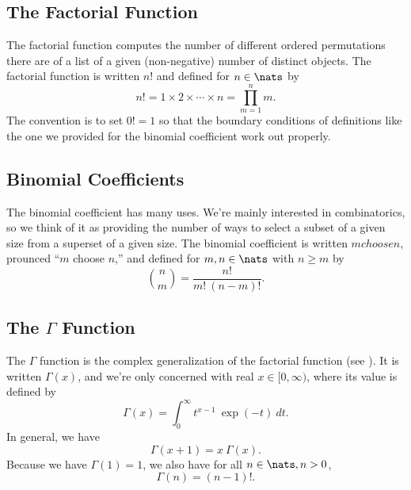 \subsection{The Factorial Function}\label{section:stats-factorial}

The factorial function computes the number of different ordered
permutations there are of a list of a given (non-negative) number of
distinct objects.  The factorial function is written $n!$
and defined for $n \in \nats$ by
%
\begin{equation}
n! = 1 \times 2 \times \cdots \times n = \prod_{m=1}^n m.
\end{equation}
%
The convention is to set $0! = 1$ so that the boundary conditions of
definitions like the one we provided for the binomial coefficient work
out properly.


\subsection{Binomial Coefficients}\label{section:stats-binomial-coefficient}

The binomial coefficient has many uses.  We're mainly interested in
combinatorics, so we think of it as providing the number of ways to
select a subset of a given size from a superset of a given size.  The
binomial coefficient is written ${m choose n}$, prounced ``$m$
choose $n$,'' and defined for $m, n \in \nats$ with $n \geq m$ by
%
\begin{equation}
{n \choose m} = \frac{n!}{m! \ (n-m)!}.
\end{equation}


\subsection{The $\Gamma$ Function}\label{section:stats-gamma-function}

The $\Gamma$ function is the complex generalization of the factorial
function (see ).  It is written $\Gamma(x)$, 
and we're only concerned with real $x \in [0,\infty)$, where its value
is defined by 
%
\begin{equation}
\Gamma(x) = \int_0^{\infty} t^{x-1} \ \exp(-t) \ dt.
\end{equation}
%
In general, we have
%
\begin{equation}
\Gamma(x+1) = x \ \Gamma(x).
\end{equation}
%
Because we have $\Gamma(1) = 1$, we also have for all $n \in \nats, n > 0$, 
%
\begin{equation}
\Gamma(n) = (n-1)!.
\end{equation}


